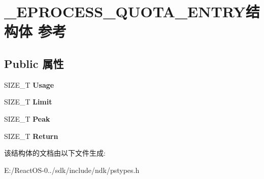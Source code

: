 \hypertarget{struct___e_p_r_o_c_e_s_s___q_u_o_t_a___e_n_t_r_y}{}\section{\+\_\+\+E\+P\+R\+O\+C\+E\+S\+S\+\_\+\+Q\+U\+O\+T\+A\+\_\+\+E\+N\+T\+R\+Y结构体 参考}
\label{struct___e_p_r_o_c_e_s_s___q_u_o_t_a___e_n_t_r_y}
\subsection*{Public 属性}
\begin{DoxyCompactItemize}
\item 
\mbox{\label{struct___e_p_r_o_c_e_s_s___q_u_o_t_a___e_n_t_r_y_a4a60d447f5908dc2f4e87e97276df0ef}} 
S\+I\+Z\+E\+\_\+T {\bfseries Usage}
\item 
\mbox{\label{struct___e_p_r_o_c_e_s_s___q_u_o_t_a___e_n_t_r_y_a4f878025727a6a718bfb86a404c42a2a}} 
S\+I\+Z\+E\+\_\+T {\bfseries Limit}
\item 
\mbox{\label{struct___e_p_r_o_c_e_s_s___q_u_o_t_a___e_n_t_r_y_a55b4544573216942cf15c90e25b63b7b}} 
S\+I\+Z\+E\+\_\+T {\bfseries Peak}
\item 
\mbox{\label{struct___e_p_r_o_c_e_s_s___q_u_o_t_a___e_n_t_r_y_a2756df0e8b8cc1f5ab22b0fb678391a1}} 
S\+I\+Z\+E\+\_\+T {\bfseries Return}
\end{DoxyCompactItemize}


该结构体的文档由以下文件生成\+:\begin{DoxyCompactItemize}
\item 
E\+:/\+React\+O\+S-\/0../sdk/include/ndk/pstypes.\+h\end{DoxyCompactItemize}
